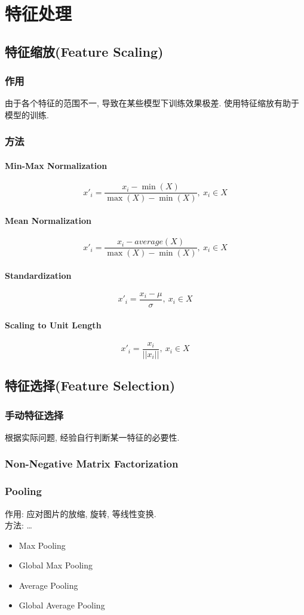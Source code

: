 \documentclass[oneside]{book}
\begin{document}
	\chapter{特征处理}
		\section{特征缩放(Feature Scaling)}
			\subsection{作用}
				由于各个特征的范围不一, 导致在某些模型下训练效果极差. 使用特征缩放有助于模型的训练.
			\subsection{方法}
				\subsubsection{Min-Max Normalization}
					$$x'_i = \frac{x_i - \min{(X)}}{\max{(X)} - \min{(X)}},~x_i\in X$$
				\subsubsection{Mean Normalization}
					$$x'_i = \frac{x_i - average(X)}{\max{(X)} - \min{(X)}},~x_i\in X$$
				\subsubsection{Standardization}
					$$x'_i = \frac{x_i - \mu}{\sigma},~x_{i}\in X$$
				\subsubsection{Scaling to Unit Length}
					 $$x'_i = \frac{x_{i}}{||x_{i}||}, ~x_i \in X$$
			\section{特征选择(Feature Selection)}
				\subsection{手动特征选择}
					根据实际问题, 经验自行判断某一特征的必要性.
				\subsection{Non-Negative Matrix Factorization}


				\subsection{Pooling}
					作用: 应对图片的放缩, 旋转, 等线性变换.\\
					方法: \dots
					\begin{itemize}
						\item Max Pooling
						\item Global Max Pooling
						\item Average Pooling
						\item Global Average Pooling
					\end{itemize}
\end{document}
